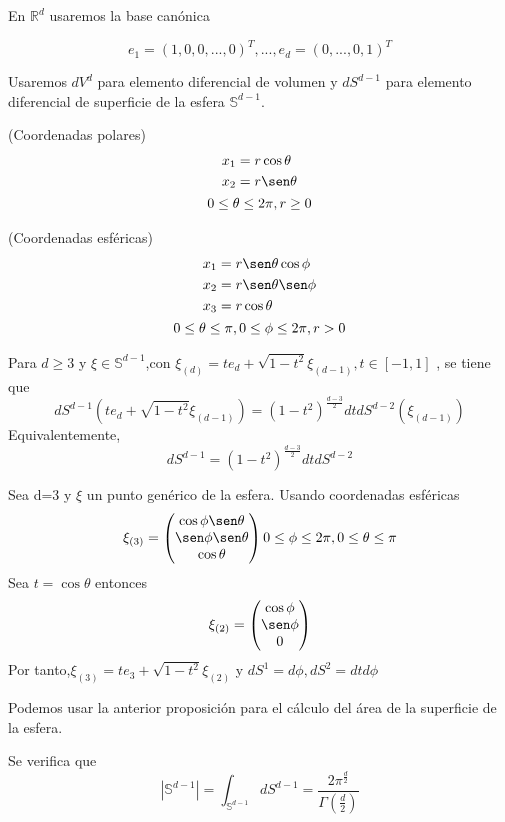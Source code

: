 En $\mathds{R}^d$ usaremos la base canónica 

$$ e_1 =(1,0,0,...,0)^T ,...,e_d=(0,...,0,1)^T $$

Usaremos $dV^d$ para elemento diferencial de volumen y $dS^{d-1}$ para elemento diferencial de superficie de la esfera $\mathds{S}^{d-1}$.

\begin{prop}(Coordenadas polares)
\begin{gather}
\begin{aligned}
x_1 &= r \cos \theta \\
x_2 &= r \sen \theta \\
\end{aligned}
\\
0 \le \theta \le 2\pi, r\ge 0
\end{gather}
\end{prop}

\begin{prop}(Coordenadas esféricas)
\begin{gather*}
\begin{aligned}
x_1 &= r \sen \theta \cos \phi\\
x_2 &= r \sen \theta \sen \phi\\
x_3 &= r \cos \theta\\
\end{aligned}
\\
0\le \theta \le \pi,0\le\phi\le2\pi,r>0
\end{gather*} 
\end{prop}
\begin{prop}Para $d \ge 3$ y $\xi \in \mathds{S}^{d-1}$,con $\xi_{(d)} = te_d+\sqrt{1-t^2}\xi_{(d-1)},  t\in[-1,1]$ , se tiene que
	$$
	dS^{d-1}(te_d+\sqrt{1-t^2}\xi_{(d-1)}) = (1-t^2)^{\frac{d-3}{2}}dt  dS^{d-2}(\xi_{(d-1)})
	$$
	Equivalentemente,
	$$
	dS^{d-1} = (1-t^2)^{\frac{d-3}{2}}dt dS^{d-2}
	$$
\end{prop}
\begin{example}Sea d=3 y $\xi$ un punto genérico de la esfera. Usando coordenadas esféricas $$
	\xi_{(3)}=\begin{pmatrix}
	\cos\phi \sen\theta\\
	\sen\phi \sen\theta\\
	\cos\theta\\
	\end{pmatrix}
	0 \le \phi \le 2\pi , 0 \le \theta \le \pi
	$$
	Sea $t=\cos\theta$ entonces
	$$
	\xi_{(2)} = \begin{pmatrix}
	\cos\phi\\
	\sen\phi\\
	0\\
	\end{pmatrix}
	$$
	Por tanto,$ \xi_{(3)} = te_3 + \sqrt{1-t^2} \xi_{(2)}$ y $dS^1 = d\phi , dS^2 = dtd\phi$
	
\end{example}
Podemos usar la anterior proposición para el cálculo del área de la superficie de la esfera.
\begin{prop}Se verifica que
	$$
	|\mathds{S}^{d-1}| = \int_{\mathds{S}^{d-1}} dS^{d-1} = \frac{2\pi^\frac{d}{2}}{\Gamma(\frac{d}{2})}
	$$
\end{prop} 


